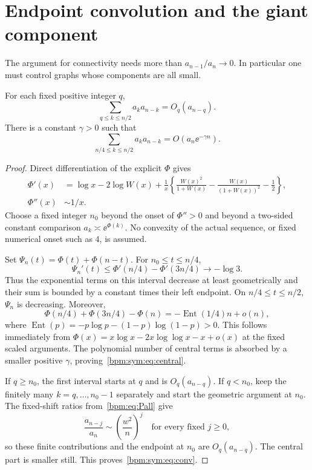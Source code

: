 \documentclass[11pt,a4paper]{article}
\theoremstyle{remark}\newtheorem{remark}[theorem]{Remark}%
\newcommand{\Ent}{\operatorname{Ent}}
\begin{document}
\section{Endpoint convolution and the giant component}\label{bpm:sym:sec:convolution}
The argument for connectivity needs more than $a_{n-1}/a_n\to0$. In particular one must control graphs whose components are all small.

\begin{lemma}\label{bpm:sym:lem:conv}
For each fixed positive integer $q$,
\begin{equation}\label{bpm:sym:eq:conv}
 \sum_{q\le k\le n/2}a_k a_{n-k}=O_q(a_{n-q}).
\end{equation}
There is a constant $\gamma>0$ such that
\begin{equation}\label{bpm:sym:eq:central}
 \sum_{n/4\le k\le n/2}a_k a_{n-k}=O(a_n\ee^{-\gamma n}).
\end{equation}
\end{lemma}
\begin{proof}
Direct differentiation of the explicit $\Phi$ gives
\begin{align}\label{bpm:sym:eq:phider}
 \Phi'(x)&=\log x-2\log W(x)
 +\frac1x\left\{\frac{W(x)^2}{1+W(x)}
 -\frac{W(x)}{(1+W(x))^2}-\frac12\right\},\nonumber\\
 \Phi''(x)&\sim 1/x.
\end{align}
Choose a fixed integer $n_0$ beyond the onset of $\Phi''>0$ and beyond a two-sided constant comparison $a_k\asymp\ee^{\Phi(k)}$. No convexity of the actual sequence, or fixed numerical onset such as $4$, is assumed.

Set $\Psi_n(t)=\Phi(t)+\Phi(n-t)$. For $n_0\le t\le n/4$,
\[
 \Psi_n'(t)\le\Phi'(n/4)-\Phi'(3n/4)\longrightarrow-\log3.
\]
Thus the exponential terms on this interval decrease at least geometrically and their sum is bounded by a constant times their left endpoint. On $n/4\le t\le n/2$, $\Psi_n$ is decreasing. Moreover,
\[
 \Phi(n/4)+\Phi(3n/4)-\Phi(n)
 =-\Ent(1/4)n+o(n),
\]
where $\Ent(p)=-p\log p-(1-p)\log(1-p)>0$. This follows immediately from
$\Phi(x)=x\log x-2x\log\log x-x+o(x)$ at the fixed scaled arguments. The polynomial number of central terms is absorbed by a smaller positive $\gamma$, proving~\eqref{bpm:sym:eq:central}.

If $q\ge n_0$, the first interval starts at $q$ and is $O_q(a_{n-q})$. If $q<n_0$, keep the finitely many $k=q,\ldots,n_0-1$ separately and start the geometric argument at $n_0$. The fixed-shift ratios from~\eqref{bpm:eq:Pall} give
\begin{equation}\label{bpm:sym:eq:ratios}
 \frac{a_{n-j}}{a_n}\sim\left(\frac{w^2}{n}\right)^j
 \quad\text{for every fixed }j\ge0,
\end{equation}
so these finite contributions and the endpoint at $n_0$ are $O_q(a_{n-q})$. The central part is smaller still. This proves~\eqref{bpm:sym:eq:conv}.
\end{proof}
\end{document}
